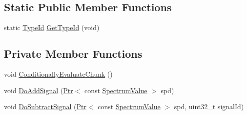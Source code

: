 \subsection*{Static Public Member Functions}
\begin{DoxyCompactItemize}
\item 
static \hyperlink{classns3_1_1TypeId}{Type\+Id} \hyperlink{classns3_1_1LteInterference_ab3f6bd0d1ac1092649f50c4bd204999c}{Get\+Type\+Id} (void)
\end{DoxyCompactItemize}
\subsection*{Private Member Functions}
\begin{DoxyCompactItemize}
\item 
void \hyperlink{classns3_1_1LteInterference_a18d105beca4a94a1f2b502139540ab12}{Conditionally\+Evaluate\+Chunk} ()
\item 
void \hyperlink{classns3_1_1LteInterference_ae69e96d42e7d8eef67db46d19b86fc2a}{Do\+Add\+Signal} (\hyperlink{classns3_1_1Ptr}{Ptr}$<$ const \hyperlink{classns3_1_1SpectrumValue}{Spectrum\+Value} $>$ spd)
\item 
void \hyperlink{classns3_1_1LteInterference_a0cf881018f086b6d34625336d754daa1}{Do\+Subtract\+Signal} (\hyperlink{classns3_1_1Ptr}{Ptr}$<$ const \hyperlink{classns3_1_1SpectrumValue}{Spectrum\+Value} $>$ spd, uint32\+\_\+t signal\+Id)
\end{DoxyCompactItemize}
